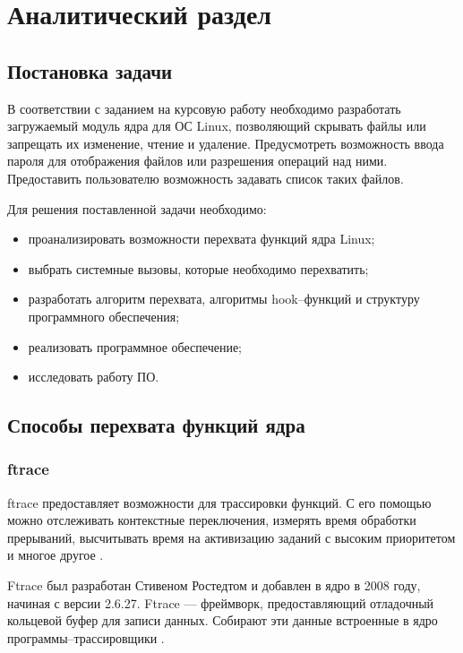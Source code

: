 \chapter{Аналитический раздел}
\label{cha:analysis}

\section{Постановка задачи}

В соответствии с заданием на курсовую работу необходимо разработать загружаемый модуль ядра для ОС Linux, позволяющий скрывать файлы или запрещать их изменение, чтение и удаление. Предусмотреть возможность ввода пароля для отображения файлов или разрешения операций над ними. Предоставить пользователю возможность задавать список таких файлов.

Для решения поставленной задачи необходимо:

\begin{itemize}
	\item проанализировать возможности перехвата функций ядра Linux;
	\item выбрать системные вызовы, которые необходимо перехватить;
	\item разработать алгоритм перехвата, алгоритмы hook--функций и структуру программного обеспечения;
	\item реализовать программное обеспечение;
	\item исследовать работу ПО.
\end{itemize}

\section{Способы перехвата функций ядра}

\subsection{ftrace}

ftrace предоставляет возможности для трассировки функций.  С его помощью можно отслеживать контекстные переключения, измерять время обработки прерываний, высчитывать время на активизацию заданий с высоким приоритетом и многое другое \cite{ftrace}.

Ftrace был разработан Стивеном Ростедтом и добавлен в ядро в 2008 году, начиная с версии 2.6.27. Ftrace --- фреймворк, предоставляющий отладочный кольцевой буфер для записи данных. Собирают эти данные встроенные в ядро программы--трассировщики \cite{ftrace}.

